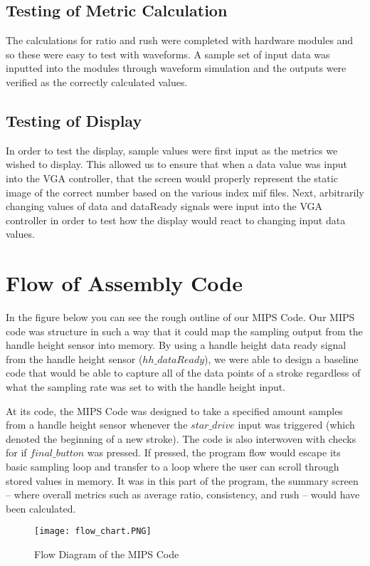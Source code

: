 \documentclass[letterpaper]{article} %
\begin{document}
\subsection{Testing of Metric Calculation}
The calculations for ratio and rush were completed with hardware modules and so these were easy to test with waveforms. A sample set of input data was inputted into the modules through waveform simulation and the outputs were verified as the correctly calculated values.
\subsection{Testing of Display}
In order to test the display, sample values were first input as the metrics we wished to display. This allowed us to ensure that when a data value was input into the VGA controller, that the screen would properly represent the static image of the correct number based on the various index mif files. Next, arbitrarily changing values of data and dataReady signals were input into the VGA controller in order to test how the display would react to changing input data values.

\pagebreak
\section{Flow of Assembly Code}

In the figure below you can see the rough outline of our MIPS Code. Our MIPS code was structure in such a way that it could map the sampling output from the handle height sensor into memory. By using a handle height data ready signal from the handle height sensor ($hh\_dataReady$), we were able to design a baseline code that would be able to capture all of the data points of a stroke regardless of what the sampling rate was set to with the handle height input.

At its code, the MIPS Code was designed to take a specified amount samples from a handle height sensor whenever the $star\_drive$ input was triggered (which denoted the beginning of a new stroke). The code is also interwoven with checks for if $final\_button$ was pressed. If pressed, the program flow would escape its basic sampling loop and transfer to a loop where the user can scroll through stored values in memory. It was in this part of the program, the summary screen -- where overall metrics such as average ratio, consistency, and rush -- would have been calculated.


\begin{figure}[!htb]
    	\centering
        	\caption{Flow Diagram of the MIPS Code}
    	\texttt{[image: flow\_chart.PNG]}
\end{figure}
\pagebreak
\end{document}
